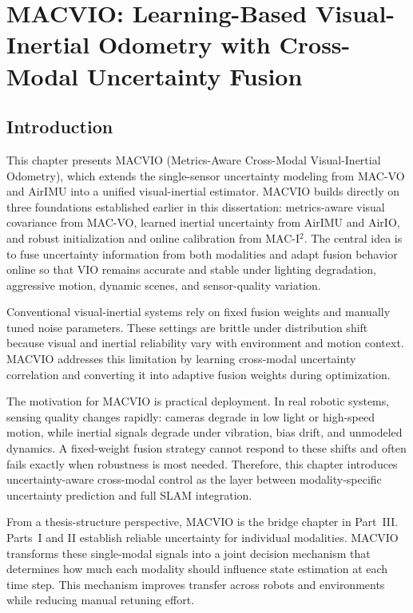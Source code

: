 \chapter{MACVIO: Learning-Based Visual-Inertial Odometry with Cross-Modal Uncertainty Fusion} \label{chapter:macvio}

\section{Introduction}

This chapter presents MACVIO (Metrics-Aware Cross-Modal Visual-Inertial Odometry), which extends the single-sensor uncertainty modeling from MAC-VO and AirIMU into a unified visual-inertial estimator.
MACVIO builds directly on three foundations established earlier in this dissertation: metrics-aware visual covariance from MAC-VO, learned inertial uncertainty from AirIMU and AirIO, and robust initialization and online calibration from MAC-I$^2$.
The central idea is to fuse uncertainty information from both modalities and adapt fusion behavior online so that VIO remains accurate and stable under lighting degradation, aggressive motion, dynamic scenes, and sensor-quality variation.

Conventional visual-inertial systems rely on fixed fusion weights and manually tuned noise parameters.
These settings are brittle under distribution shift because visual and inertial reliability vary with environment and motion context.
MACVIO addresses this limitation by learning cross-modal uncertainty correlation and converting it into adaptive fusion weights during optimization.

The motivation for MACVIO is practical deployment.
In real robotic systems, sensing quality changes rapidly: cameras degrade in low light or high-speed motion, while inertial signals degrade under vibration, bias drift, and unmodeled dynamics.
A fixed-weight fusion strategy cannot respond to these shifts and often fails exactly when robustness is most needed.
Therefore, this chapter introduces uncertainty-aware cross-modal control as the layer between modality-specific uncertainty prediction and full SLAM integration.

From a thesis-structure perspective, MACVIO is the bridge chapter in Part~III.
Parts~I and II establish reliable uncertainty for individual modalities.
MACVIO transforms these single-modal signals into a joint decision mechanism that determines how much each modality should influence state estimation at each time step.
This mechanism improves transfer across robots and environments while reducing manual retuning effort.

